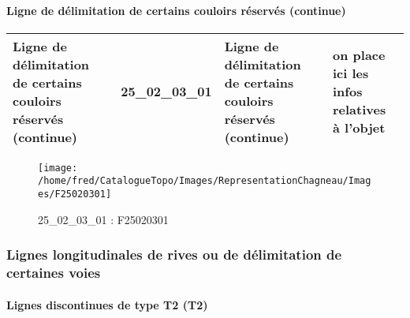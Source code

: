 \documentclass[12pt,titlepage,oneside]{book}
\begin{document}
\paragraph{Ligne de délimitation de certains couloirs réservés (continue)}
\noindent
\vspace{\baselineskip}

\renewcommand{\arraystretch}{1.2}
\begin{supertabular}{|p{10cm}|c|p{13cm}|p{12cm}|}
 Ligne de délimitation de certains couloirs réservés (continue) & 25\_02\_03\_01 & Ligne de délimitation de certains couloirs réservés (continue) & on place ici les infos relatives à l'objet\\
\hline
\end{supertabular}
\begin{figure}[h!]
  \hfill         %
  \begin{minipage}[t]{3cm}
    \begin{center}
      \texttt{[image: /home/fred/CatalogueTopo/Images/RepresentationChagneau/Images/F25020301]}
      \caption[F25020301]{\label{} 25\_02\_03\_01 : F25020301}
    \end{center}
  \end{minipage}
\end{figure}

\subsubsection{\large Lignes longitudinales de rives ou de délimitation de certaines voies}
\paragraph{Lignes discontinues de type T2 (T2)}
\noindent
\vspace{\baselineskip}
\end{document}
